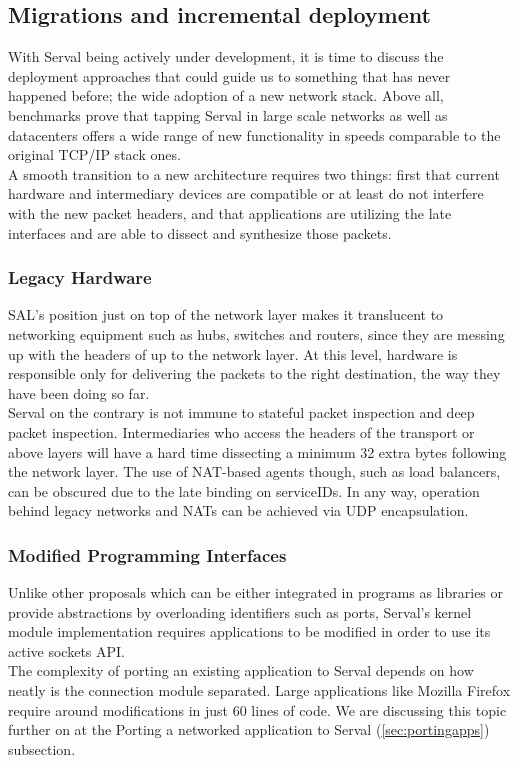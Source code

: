 \subsection{Migrations and incremental deployment}
With Serval being actively under development, it is time to discuss the deployment approaches that could guide us to something that has never happened before; the wide adoption of a new network stack.
Above all, benchmarks prove that tapping Serval in large scale networks as well as datacenters offers a wide range of new functionality in speeds comparable to the original TCP/IP stack ones.\\
\indent A smooth transition to a new architecture requires two things: first that current hardware and intermediary devices are compatible or at least do not interfere with the new packet headers, and that applications are utilizing the late interfaces and are able to dissect and synthesize those packets.

\subsubsection{Legacy Hardware}
SAL's position just on top of the network layer makes it translucent to networking equipment such as hubs, switches and routers, since they are messing up with the headers of up to the network layer.
At this level, hardware is responsible only for delivering the packets to the right destination, the way they have been doing so far.\\
\indent Serval on the contrary is not immune to stateful packet inspection and deep packet inspection.
Intermediaries who access the headers of the transport or above layers will have a hard time dissecting a minimum 32 extra bytes following the network layer.
The use of NAT-based agents though, such as load balancers, can be obscured due to the late binding on serviceIDs.
In any way, operation behind legacy networks and NATs can be achieved via UDP encapsulation.

\subsubsection{Modified Programming Interfaces}
Unlike other proposals which can be either integrated in programs as libraries or provide abstractions by overloading identifiers such as ports, Serval's kernel module implementation requires applications to be modified in order to use its active sockets API.\\
\indent The complexity of porting an existing application to Serval depends on how neatly is the connection module separated.
Large applications like Mozilla Firefox require around modifications in just 60 lines of code.
We are discussing this topic further on at the Porting a networked application to Serval (\ref{sec:portingapps}) subsection.


